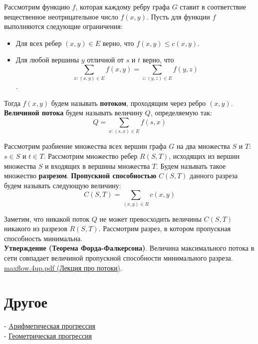 \documentclass{article}
\begin{document}
Рассмотрим функцию $f$, которая каждому ребру графа $G$ ставит в соответствие вещественное неотрицательное число $f(x, y)$. Пусть для функции $f$ выполняются следующие ограничения:

\begin{itemize}
	\item Для всех ребер $(x, y) \in E$ верно, что $f(x, y) \le c(x, y)$.
	\item Для любой вершины $y$ отличной от $s$ и $t$ верно, что $$\sum_{x : (x, y) \in E} f(x, y) = \sum_{z : (y, z) \in E} f(y, z)$$.
\end{itemize}  

Тогда $f(x, y)$ будем называть \textbf{потоком}, проходящим через ребро $(x, y)$. \textbf{Величиной потока} будем называть величину $Q$, определяемую так: $$Q = \sum_{x: (s, x) \in E} f(s, x) $$

Рассмотрим разбиение множества всех вершин графа $G$ на два множества $S$ и $T$: $s \in S$ и $t \in T$. Рассмотрим множество ребер $R(S, T)$, исходящих из вершин множества $S$ и входящих в вершины множества $T$. Будем называть такое множество \textbf{разрезом}. \textbf{Пропускной способностью} $C(S, T)$ данного разреза будем называть следующую величину: $$ C(S, T) = \sum_{(x, y) \in R} c(x, y) $$

Заметим, что никакой поток $Q$ не может превосходить величины $C(S, T)$ никакого из разрезов $R(S, T)$. Рассмотрим разрез, в котором пропускная способность минимальна. \\

\textbf{Утверждение (Теорема Форда-Фалкерсона)}. Величина максимального потока в сети совпадает величиной пропускной способности минимального разреза. \\

\href{https://www.cs.princeton.edu/courses/archive/spr04/cos226/lectures/maxflow.4up.pdf}{maxflow.4up.pdf (Лекция про потоки)}.

\section{Другое}

- \href{https://ru.wikipedia.org/wiki/%D0%90%D1%80%D0%B8%D1%84%D0%BC%D0%B5%D1%82%D0%B8%D1%87%D0%B5%D1%81%D0%BA%D0%B0%D1%8F_%D0%BF%D1%80%D0%BE%D0%B3%D1%80%D0%B5%D1%81%D1%81%D0%B8%D1%8F}{Aрифметическая прогрессия} \\
- \href{https://ru.wikipedia.org/wiki/%D0%93%D0%B5%D0%BE%D0%BC%D0%B5%D1%82%D1%80%D0%B8%D1%87%D0%B5%D1%81%D0%BA%D0%B0%D1%8F_%D0%BF%D1%80%D0%BE%D0%B3%D1%80%D0%B5%D1%81%D1%81%D0%B8%D1%8F}{Геометрическая прогрессия} \\
\end{document}
